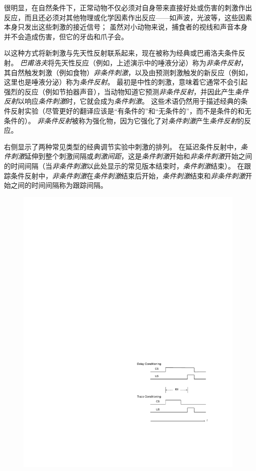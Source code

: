 很明显，在自然条件下，正常动物不仅必须对自身带来直接好处或伤害的刺激作出反应，而且还必须对其他物理或化学因素作出反应——如声波，光波等，这些因素本身只发出这些刺激的接近信号；
虽然对小动物来说，捕食者的视线和声音本身并不会造成伤害，但它的牙齿和爪子会。


以这种方式将新刺激与先天性反射联系起来，现在被称为经典或巴甫洛夫条件反射。
\textit{巴甫洛夫}将先天性反应（例如，上述演示中的唾液分泌）称为\textit{非条件反射}，其自然触发刺激（例如食物）\textit{非条件刺激}，以及由预测刺激触发的新反应（例如，这里也是唾液分泌）称为\textit{条件反射}。
最初是中性的刺激，意味着它通常不会引起强烈的反应（例如节拍器声音），当动物知道它预测\textit{非条件反射}，并因此产生\textit{条件反射}以响应\textit{条件刺激}时，它就会成为\textit{条件刺激}。
这些术语仍然用于描述经典的条件反射实验（尽管更好的翻译应该是“有条件的”和“无条件的”，而不是条件的和无条件的）。
\textit{非条件反射}被称为强化物，因为它强化了对\textit{条件刺激}产生\textit{条件反射}的反应。


右侧显示了两种常见类型的经典调节实验中刺激的排列。
在延迟条件反射中，\textit{条件刺激}延伸到整个刺激间隔或\textit{刺激间距}，这是\textit{条件刺激}开始和\textit{非条件刺激}开始之间的时间间隔（当\textit{非条件刺激}以此处显示的常见版本结束时，\textit{条件刺激}结束）。
在跟踪条件反射中，\textit{非条件刺激}在\textit{条件刺激}结束后开始，\textit{条件刺激}结束和\textit{非条件刺激}开始之间的时间间隔称为跟踪间隔。


\begin{figure}[!htb]
	\centering
	\includegraphics[width=0.5\linewidth]{chap11/fig_11_0}
	\caption{  \label{fig:11_0}}
\end{figure}


